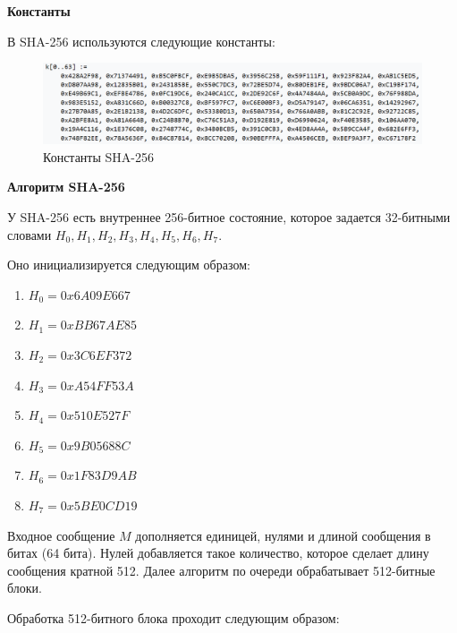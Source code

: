 \documentclass[colorthm]{./civarticle}
\begin{document}
\textbf{Константы}

В SHA-256 используются следующие константы:
\begin{figure}[H]
    \centering
    \includegraphics[width=0.6\linewidth]{sha_256_consts.png}
    \caption{Константы SHA-256}
    \label{fig:enter-label}
\end{figure}

\textbf{Алгоритм SHA-256}

У SHA-256 есть внутреннее 256-битное состояние, которое задается 32-битными словами $H_0, H_1, H_2, H_3, H_4, H_5, H_6, H_7$. 

Оно инициализируется следующим образом:

\begin{enumerate}
    \item $H_0 = 0x6A09E667$
    \item $H_1 = 0xBB67AE85$
    \item $H_2 = 0x3C6EF372$
    \item $H_3 = 0xA54FF53A$
    \item $H_4 = 0x510E527F$
    \item $H_5 = 0x9B05688C$
    \item $H_6 = 0x1F83D9AB$
    \item $H_7 = 0x5BE0CD19$
\end{enumerate}

Входное сообщение $M$ дополняется единицей, нулями и длиной сообщения в битах (64 бита). Нулей добавляется такое количество, которое сделает длину сообщения кратной 512. Далее алгоритм по очереди обрабатывает 512-битные блоки.

Обработка 512-битного блока проходит следующим образом:
\end{document}

